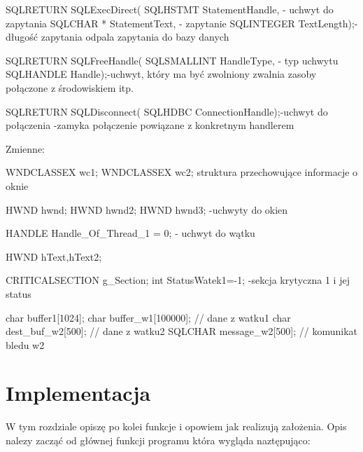\documentclass[a4paper,twoside,12pt]{mgr}
\begin{document}
     SQLRETURN SQLExecDirect(
     SQLHSTMT     StatementHandle, - uchwyt do zapytania
     SQLCHAR *    StatementText, - zapytanie
     SQLINTEGER   TextLength);- długość zapytania
     odpala zapytania do bazy danych 
     
     SQLRETURN SQLFreeHandle(
     SQLSMALLINT   HandleType, - typ uchwytu
     SQLHANDLE     Handle);-uchwyt, który ma być zwolniony
     zwalnia zasoby połączone z środowiskiem itp.
     
     SQLRETURN SQLDisconnect(
     SQLHDBC     ConnectionHandle);-uchwyt do połączenia
     -zamyka połączenie powiązane z konkretnym handlerem
     
     Zmienne:
     
     WNDCLASSEX wc1;
	WNDCLASSEX wc2; struktura przechowujące informacje o oknie
	
	HWND hwnd;
	HWND hwnd2;
	HWND hwnd3; -uchwyty do okien
	
	HANDLE Handle\_Of\_Thread\_1 = 0; - uchwyt do wątku
	
	HWND hText,hText2;
	
	CRITICALSECTION g\_Section; 
	int StatusWatek1=-1;   -sekcja krytyczna 1 i jej status

		
		
		
	char buffer1[1024];
	char buffer\_w1[100000]; // dane z watku1 
	char dest\_buf\_w2[500]; // dane z watku2
	SQLCHAR message\_w2[500]; // komunikat bledu w2
     
     
  
 
\chapter{Implementacja}
W tym rozdziale opiszę po kolei funkcje i opowiem jak realizują założenia. Opis nalezy zacząć od głównej funkcji programu która wygląda naztępująco:
		
\end{document}
